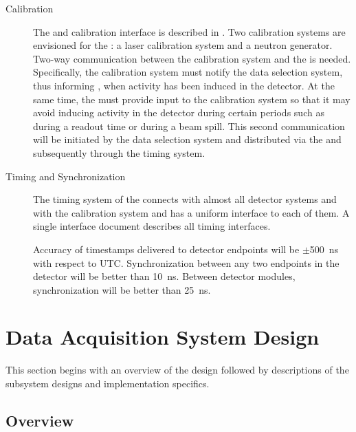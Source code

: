 \begin{description}
\item[Calibration] The  and calibration interface is described in . Two calibration systems are envisioned for the : a laser calibration system and a neutron generator. 
  Two-way communication between the calibration system and the
   is needed.  Specifically, the calibration system must
  notify the data selection system, thus informing ,
  when activity has been induced in the detector. At the same time, the  must provide input to the calibration system so that it may avoid inducing activity in the detector during certain periods such as during a  readout time or during a beam spill.
This second communication will be initiated by the data selection
system and distributed via the  and
subsequently through the
 timing system.


\item[Timing and Synchronization] The timing system of the   connects with almost all detector systems and with the calibration system and has a uniform interface to each of them. 
  A single interface document  describes all timing interfaces. 

Accuracy of timestamps delivered to  detector endpoints will be $\pm$\SI{500}{\nano\second} with respect to UTC. Synchronization between any two endpoints in the detector will be better than \SI{10}{\nano\second}. Between detector modules, synchronization will be better than \SI{25}{\nano\second}.  
\end{description}

\section{Data Acquisition System Design}
\label{sec:fd-daq:design}

This section begins with an overview of the 
design followed by
descriptions of the subsystem designs and implementation specifics.

\subsection{Overview}
\label{sec:fd-daq:design-overview}

